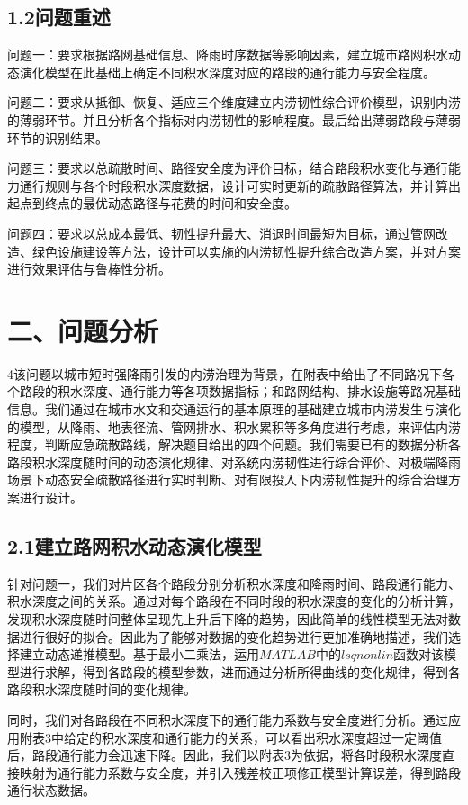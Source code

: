 \documentclass[UTF8,a4paper,12pt]{ctexart}
\begin{document}
\subsection{1.2问题重述}

问题一：要求根据路网基础信息、降雨时序数据等影响因素，建立城市路网积水动态演化模型在此基础上确定不同积水深度对应的路段的通行能力与安全程度。

问题二：要求从抵御、恢复、适应三个维度建立内涝韧性综合评价模型，识别内涝的薄弱环节。并且分析各个指标对内涝韧性的影响程度。最后给出薄弱路段与薄弱环节的识别结果。

问题三：要求以总疏散时间、路径安全度为评价目标，结合路段积水变化与通行能力通行规则与各个时段积水深度数据，设计可实时更新的疏散路径算法，并计算出起点到终点的最优动态路径与花费的时间和安全度。

问题四：要求以总成本最低、韧性提升最大、消退时间最短为目标，通过管网改造、绿色设施建设等方法，设计可以实施的内涝韧性提升综合改造方案，并对方案进行效果评估与鲁棒性分析。

\section{二、问题分析}

4该问题以城市短时强降雨引发的内涝治理为背景，在附表中给出了不同路况下各个路段的积水深度、通行能力等各项数据指标；和路网结构、排水设施等路况基础信息。我们通过在城市水文和交通运行的基本原理的基础建立城市内涝发生与演化的模型，从降雨、地表径流、管网排水、积水累积等多角度进行考虑，来评估内涝程度，判断应急疏散路线，解决题目给出的四个问题。我们需要已有的数据分析各路段积水深度随时间的动态演化规律、对系统内涝韧性进行综合评价、对极端降雨场景下动态安全疏散路径进行实时判断、对有限投入下内涝韧性提升的综合治理方案进行设计。

\subsection{2.1建立路网积水动态演化模型}

针对问题一，我们对片区各个路段分别分析积水深度和降雨时间、路段通行能力、积水深度之间的关系。通过对每个路段在不同时段的积水深度的变化的分析计算，发现积水深度随时间整体呈现先上升后下降的趋势，因此简单的线性模型无法对数据进行很好的拟合。因此为了能够对数据的变化趋势进行更加准确地描述，我们选择建立动态递推模型。基于最小二乘法，运用$MATLAB$中的$lsqnonlin$函数对该模型进行求解，得到各路段的模型参数，进而通过分析所得曲线的变化规律，得到各路段积水深度随时间的变化规律。

同时，我们对各路段在不同积水深度下的通行能力系数与安全度进行分析。通过应用附表3中给定的积水深度和通行能力的关系，可以看出积水深度超过一定阈值后，路段通行能力会迅速下降。因此，我们以附表3为依据，将各时段积水深度直接映射为通行能力系数与安全度，并引入残差校正项修正模型计算误差，得到路段通行状态数据。
\end{document}

